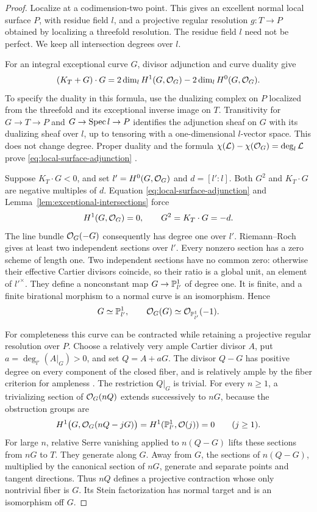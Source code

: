 \begin{proof}
Localize at a codimension-two point.  This gives an excellent normal local
surface \(P\), with residue field \(l\), and a projective regular resolution
\(g:T\to P\) obtained by localizing a threefold resolution.
The residue field \(l\) need not be perfect.  We keep all intersection
degrees over \(l\).

For an integral exceptional curve \(G\), divisor adjunction and curve
duality give
\begin{equation}
\label{eq:local-surface-adjunction}
 (K_T+G)\cdot G
 =2\dim_lH^1(G,\mathcal O_G)-2\dim_lH^0(G,\mathcal O_G).
\end{equation}
To specify the duality in this formula, use the dualizing complex on \(P\)
localized from the threefold and its exceptional inverse image on \(T\).
Transitivity for \(G\to T\to P\) and
\(G\to\operatorname{Spec} l\to P\) identifies the adjunction sheaf on \(G\) with
its dualizing sheaf over \(l\), up to tensoring with a one-dimensional
\(l\)-vector space.  This does not change degree.
Proper duality and the formula
\(\chi(\mathcal L)-\chi(\mathcal O_G)=\deg_l\mathcal L\) prove
\eqref{eq:local-surface-adjunction}
\cite{hartshorne1966,hartshorne1977}.

Suppose \(K_T\cdot G<0\), and set
\(l'=H^0(G,\mathcal O_G)\) and \(d=[l':l]\).
Both \(G^2\) and \(K_T\cdot G\) are negative multiples of \(d\).
Equation \eqref{eq:local-surface-adjunction} and
Lemma~\ref{lem:exceptional-intersections} force
\[
 H^1(G,\mathcal O_G)=0,\qquad G^2=K_T\cdot G=-d.
\]
The line bundle \(\mathcal O_G(-G)\) consequently has degree one over \(l'\).
Riemann--Roch gives at least two independent sections over \(l'\).
Every nonzero section has a zero scheme of length one.  Two independent
sections have no common zero: otherwise their effective Cartier divisors
coincide, so their ratio is a global unit, an element of \(l'^\times\).
They define a nonconstant map \(G\to\mathbb P^1_{l'}\) of degree one.
It is finite, and a finite birational morphism to a normal curve is an
isomorphism.  Hence
\[
 G\simeq\mathbb P^1_{l'},\qquad \mathcal O_G(G)\simeq\mathcal O_{\mathbb P^1_{l'}}(-1).
\]

For completeness this curve can be contracted while retaining a
projective regular resolution over \(P\).  Choose a relatively very ample
Cartier divisor \(A\), put \(a=\deg_{l'}(A|_G)>0\), and set \(Q=A+aG\).
The divisor \(Q-G\) has positive degree on every component of the closed
fiber, and is relatively ample by the fiber criterion for ampleness
\cite{egaIII}.  The restriction \(Q|_G\) is trivial.
For every \(n\geq1\), a trivializing section of \(\mathcal O_G(nQ)\) extends
successively to \(nG\), because the obstruction groups are
\[
 H^1\bigl(G,\mathcal O_G(nQ-jG)\bigr)
   =H^1(\mathbb P^1_{l'},\mathcal O(j))=0\qquad(j\geq1).
\]
For large \(n\), relative Serre vanishing applied to \(n(Q-G)\) lifts
these sections from \(nG\) to \(T\).  They generate along \(G\).
Away from \(G\), the sections of \(n(Q-G)\), multiplied by the canonical
section of \(nG\), generate and separate points and tangent directions.
Thus \(nQ\) defines a projective contraction whose only nontrivial fiber
is \(G\).  Its Stein factorization has normal target and is an isomorphism
off \(G\).


\end{proof}
